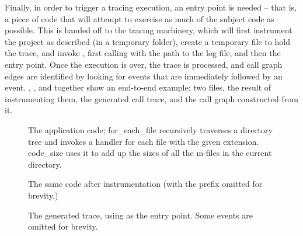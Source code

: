 Finally, in order to trigger a tracing execution, an entry point is needed --
that is, a piece of code that will attempt to exercise as much of the subject
code as possible. This is handed off to the tracing machinery, which will first
instrument the project as described (in a temporary folder), create a temporary
file to hold the trace, and invoke \matlab, first calling
 with the path to the log file, and then the
entry point. Once the execution is over, the trace is processed, and call
graph edges are identified by looking for  events that are
immediately followed by an  event. ,
,  and 
together show an end-to-end example; two \matlab files, the result of
instrumenting them, the generated call trace, and the call graph constructed
from it.

\begin{figure}[htbp]
\begin{minipage}{\linewidth}
  
\end{minipage}
\begin{minipage}{\linewidth}
  
\end{minipage}
\caption{The application code; for\_each\_file recursively traverses a directory
tree and invokes a handler for each file with the given extension. code\_size
uses it to add up the sizes of all the m-files in the current directory.}
\label{Fig:CallgraphBefore}
\end{figure}

\begin{figure}[htbp]
\begin{minipage}{\linewidth}
  
\end{minipage}
\begin{minipage}{\linewidth}
  
\end{minipage}
\caption{The same code after instrumentation (with the 
prefix omitted for brevity.)}
\label{Fig:CallgraphAfter}
\end{figure}

\begin{figure}[htbp]

\caption{The generated trace, using  as the entry point.
Some events are omitted for brevity.}
\label{Fig:CallgraphTrace}
\end{figure}

